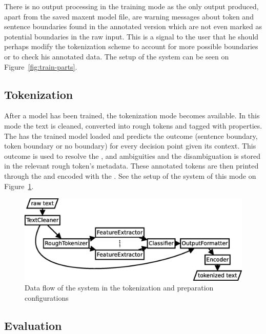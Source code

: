 There is no output processing in the training mode as the only output produced,
apart from the saved maxent model file, are warning messages about token and
sentence boundaries found in the annotated version which are not even marked as
potential boundaries in the raw input. This is a signal to the user that he
should perhaps modify the tokenization scheme to account for more possible
boundaries or to check his annotated data. The setup of the system can be seen
on Figure~\ref{fig:train-parts}.

\subsection{Tokenization}
\label{ssec:impl-modes-tokenize}

After a model has been trained, the tokenization mode becomes available. In
this mode the text is cleaned, converted into rough tokens and tagged with
properties. The  has the trained model loaded and predicts
the outcome (sentence boundary, token boundary or no boundary) for every
decision point given its context. This outcome is used to resolve the
\maysplit{}, \mayjoin{} and \maybreaksentence{} ambiguities and the
disambiguation is stored in the relevant rough token's metadata. These
annotated tokens are then printed through the  and
encoded with the . See the setup of the system of this mode on
Figure~\ref{fig:tokenize-parts}.

\begin{figure}
  \begin{center}
    \includegraphics[width=\textwidth]{img/tokenize-parts.eps}
    \caption{Data flow of the system in the tokenization and preparation
             configurations}
    \label{fig:tokenize-parts}
  \end{center}
\end{figure}

\subsection{Evaluation}
\label{ssec:impl-modes-evaluate}

